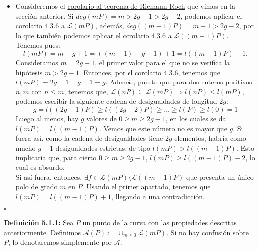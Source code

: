 \documentclass[11pt,spanish]{book}
\newcommand{\qed}{\begin{flushright} $\square$ \end{flushright}}
\begin{document}
\begin{itemize}
    \item Consideremos el \hyperlink{fuertementeAG}{corolario al teorema de Riemann-Roch} que vimos en la sección anterior. Si $deg(mP)=m>2g-1>2g-2$, podemos aplicar el \hyperlink{fuertementeAG}{corolario 4.3.6} a $\mathcal{L}(mP)$, además, $deg((m-1)P)=m-1>2g-2$, por lo que también podemos aplicar el \hyperlink{fuertementeAG}{corolario 4.3.6} a $\mathcal{L}((m-1)P)$. Tenemos pues:
    $$l(mP)=m-g+1=((m-1)-g+1)+1=l((m-1)P)+1.$$
    Consideramos $m=2g-1$, el primer valor para el que no se verifica la hipótesis $m>2g-1$. Entonces, por el corolario 4.3.6, tenemos que $l(mP)=2g-1-g+1=g$. Además, puesto que para dos enteros positivos $n,m$ con $n\leq m$, tenemos que, $\mathcal{L}(nP)\subseteq \mathcal{L}(mP)\Rightarrow l(nP)\leq l(mP)$, podemos escribir la siguiente cadena de desigualdades de longitud $2g$:
    $$g=l((2g-1)P)\geq l((2g-2)P)\geq\ldots \geq l(P)\geq l(0)=1$$
    Luego al menos, hay $g$ valores de $0\geq m\geq 2g-1$, en los cuales se da $l(mP)=l((m-1)P)$. Vemos que este número no es mayor que $g$. Si fuera así, como la cadena de desigualdades tiene $2g$ elementos, habría como mucho $g-1$ desigualdades estrictas; de tipo $l(mP)>l((m-1)P)$. Esto implicaría que, para cierto $0\geq m\geq 2g-1$, $l(mP)\geq l((m-1)P)-2$, lo cual es absurdo. \\
    Si así fuera, entonces, $\exists f\in \mathcal{L}(mP)\setminus \mathcal{L}((m-1)P)$ que presenta un único polo de grado $m$ en $P$. Usando el primer apartado, tenemos que $l(mP)=l((m-1)P)+1$, llegando a una contradicción.
\end{itemize}
\qed
\textbf{Definición 5.1.1: } Sea $P$ un punto de la curva con las propiedades descritas anteriormente. Definimos $\mathcal{A}(P):=\cup_{m\geq 0} \mathcal{L}(mP)$. Si no hay confusión sobre $P$, lo denotaremos simplemente por $\mathcal{A}$.\\
\end{document}
